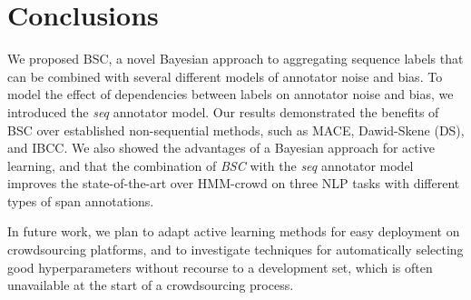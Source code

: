 \section{Conclusions}

We proposed BSC, a novel Bayesian approach to aggregating sequence labels
that can be combined with several different models of annotator noise and bias.
To model the effect of dependencies between labels on annotator noise and bias, we introduced 
the \emph{seq} annotator model.
Our results demonstrated the benefits of BSC over established non-sequential methods, such 
as MACE, Dawid-Skene (DS), and IBCC.
We also showed the advantages of a Bayesian approach for active learning,
and that the combination of \emph{BSC} with the \emph{seq} annotator model improves 
the state-of-the-art over HMM-crowd on three NLP tasks with different types of span annotations.

In future work, we plan to adapt active learning methods for easy deployment on crowdsourcing platforms,
and to investigate techniques for automatically selecting good hyperparameters without recourse to a development
set, which is often unavailable at the start of a crowdsourcing process.


